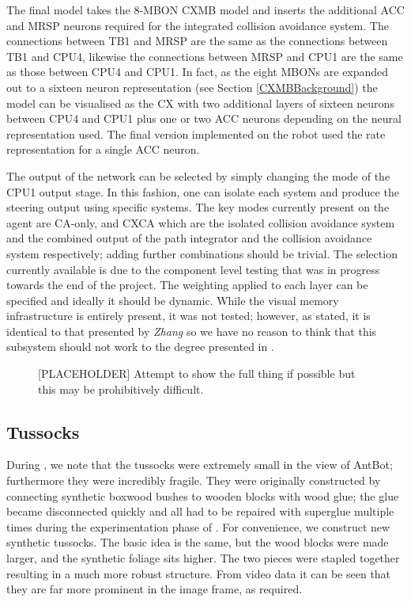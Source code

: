 \documentclass[a4paper,11pt,twoside,openright]{article}
\begin{document}
The final model takes the 8-MBON CXMB model and inserts the additional ACC and
MRSP neurons required for the integrated collision avoidance system. The
connections between TB1 and MRSP are the same as the connections between TB1
and CPU4, likewise the connections between MRSP and CPU1 are the same as those
between CPU4 and CPU1. In fact, as the eight MBONs are expanded out to a
sixteen neuron representation (see Section \ref{CXMBBackground}) the
model can be visualised as the CX with two additional layers of sixteen neurons
between CPU4 and CPU1 plus one or two ACC neurons depending on the neural
representation used. The final version implemented on the robot used the rate
representation for a single ACC neuron.
\newline\par

The output of the network can be selected by simply changing the mode of the
CPU1 output stage. In this fashion, one can isolate each system and produce
the steering output using specific systems. The key modes currently present on
the agent are CA-only, and CXCA which are the isolated collision avoidance system
and the combined output of the path integrator and the collision avoidance
system respectively; adding further combinations should be trivial. The
selection currently available is due to the component level testing that
was in progress towards the end of the project. The weighting applied to each
layer can be specified and ideally it should be dynamic. While the visual
memory infrastructure is entirely present, it was not tested; however, as stated,
it is identical to that presented by \textit{Zhang} so we have no reason to
think that this subsystem should not work to the degree presented in
\cite{Zhang2017}.

\begin{figure}
\caption{\label{fig:ecx} [PLACEHOLDER] Attempt to show the full thing if possible
  but this may be prohibitively difficult.}
\end{figure}

\subsection{Tussocks}
During \cite{Mitchell2018}, we note that the tussocks were extremely
small in the view of AntBot; furthermore they were incredibly
fragile. They were originally constructed by connecting synthetic
boxwood bushes to wooden blocks with wood glue; the glue became
disconnected quickly and all had to be repaired with superglue
multiple times during the experimentation phase of
\cite{Mitchell2018}. For convenience, we construct new synthetic
tussocks. The basic idea is the same, but the wood blocks were made
larger, and the synthetic foliage sits higher. The two pieces were
stapled together resulting in a much more robust structure. From video
data it can be seen that they are far more prominent in the image
frame, as required.
\end{document}
